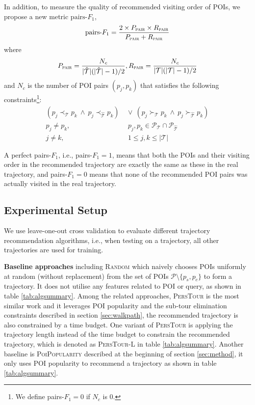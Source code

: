 In addition, to measure the quality of recommended visiting order of POIs,
we propose a new metric $\text{pairs-}F_1$,
\begin{displaymath}
\text{pairs-}F_1 = \frac{2 \times P_{\textsc{pair}} \times R_{\textsc{pair}}}
                       {P_{\textsc{pair}} + R_{\textsc{pair}}}
\end{displaymath}
where
\begin{displaymath}
P_{\textsc{pair}} = \frac{N_c} {|\hat{\mathcal{T}}|(|\hat{\mathcal{T}}|-1) / 2},
R_{\textsc{pair}} = \frac{N_c} {|\mathcal{T}|(|\mathcal{T}|-1) / 2}
\end{displaymath}
and $N_c$ is the number of POI pairs $(p_j, p_k)$ that satisfies the following
constraints\footnote{We define pairs-$F_1=0$ if $N_c$ is $0$.}:
\begin{align*}
    (p_j \prec_{\mathcal{T}} p_k ~\land~ p_j \prec_{\hat{\mathcal{T}}} p_k) & ~\lor~
    (p_j \succ_{\mathcal{T}} p_k ~\land~ p_j \succ_{\hat{\mathcal{T}}} p_k) \\
    p_j \ne p_k, &~~ p_j, p_k \in \mathcal{P}_{\mathcal{T}} \cap \mathcal{P}_{\hat{\mathcal{T}}} \\
    j \ne k, &~~ 1 \le j, k \le |\mathcal{T}|
\end{align*}

A perfect pairs-$F_1$, i.e., pairs-$F_1 = 1$, means that both the POIs and their visiting order in the
recommended trajectory are exactly the same as these in the real trajectory,
and pairs-$F_1 = 0$ means that none of the recommended POI pairs was actually visited in the real trajectory.


\subsection{Experimental Setup}
\label{sec:setup}
We use leave-one-out cross validation to evaluate different trajectory recommendation algorithms,
i.e., when testing on a trajectory, all other trajectories are used for training.

{\bf Baseline approaches} including \textsc{Random} which naively chooses POIs uniformly at random 
(without replacement) from the set of POIs $\mathcal{P} \setminus \{p_s, p_e \}$ to form a trajectory.
It does not utilise any features related to POI or query, as shown in  table \ref{tab:algsummary}.
Among the related approaches, \textsc{PersTour}\cite{ijcai15} is the most similar work and it 
leverages POI popularity and the sub-tour elimination constraints described in section \ref{sec:walkpath},
the recommended trajectory is also constrained by a time budget.
One variant of \textsc{PersTour} is applying the trajectory length instead of the time budget to constrain
the recommended trajectory, which is denoted as \textsc{PersTour-L} in table \ref{tab:algsummary}.
Another baseline is \textsc{PoiPopularity} described at the beginning of section \ref{sec:method},
it only uses POI popularity to recommend a trajectory as shown in table \ref{tab:algsummary}.
 
